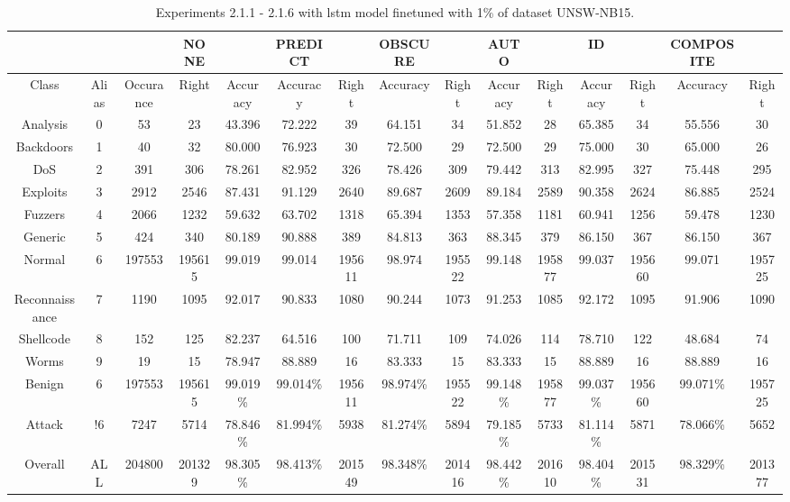 \begin{table}[htb]
    \centering
    \begin{tabular}{@{}ccccccccccccccc@{}}
        \toprule
         &  &  & NONE &  & PREDICT &  & OBSCURE &  & AUTO &  & ID &  & COMPOSITE &  \\
        \midrule
        Class &  Alias &  Occurance &  Right &  Accuracy &  Accuracy &  Right &  Accuracy &  Right &  Accuracy &  Right &  Accuracy &  Right &  Accuracy &  Right \\
        Analysis &  0 &  53 &  23 &  43.396 &  72.222 &  39 &  64.151 &  34 &  51.852 &  28 &  65.385 &  34 &  55.556 &  30 \\
        Backdoors &  1 &  40 &  32 &  80.000 &  76.923 &  30 &  72.500 &  29 &  72.500 &  29 &  75.000 &  30 &  65.000 &  26 \\
        DoS &  2 &  391 &  306 &  78.261 &  82.952 &  326 &  78.426 &  309 &  79.442 &  313 &  82.995 &  327 &  75.448 &  295 \\
        Exploits &  3 &  2912 &  2546 &  87.431 &  91.129 &  2640 &  89.687 &  2609 &  89.184 &  2589 &  90.358 &  2624 &  86.885 &  2524 \\
        Fuzzers &  4 &  2066 &  1232 &  59.632 &  63.702 &  1318 &  65.394 &  1353 &  57.358 &  1181 &  60.941 &  1256 &  59.478 &  1230 \\
        Generic &  5 &  424 &  340 &  80.189 &  90.888 &  389 &  84.813 &  363 &  88.345 &  379 &  86.150 &  367 &  86.150 &  367 \\
        Normal &  6 &  197553 &  195615 &  99.019 &  99.014 &  195611 &  98.974 &  195522 &  99.148 &  195877 &  99.037 &  195660 &  99.071 &  195725 \\
        Reconnaissance &  7 &  1190 &  1095 &  92.017 &  90.833 &  1080 &  90.244 &  1073 &  91.253 &  1085 &  92.172 &  1095 &  91.906 &  1090 \\
        Shellcode &  8 &  152 &  125 &  82.237 &  64.516 &  100 &  71.711 &  109 &  74.026 &  114 &  78.710 &  122 &  48.684 &  74 \\
        Worms &  9 &  19 &  15 &  78.947 &  88.889 &  16 &  83.333 &  15 &  83.333 &  15 &  88.889 &  16 &  88.889 &  16 \\
        Benign &  6 &  197553 &  195615 &  99.019\% &  99.014\% &  195611 &  98.974\% &  195522 &  99.148\% &  195877 &  99.037\% &  195660 &  99.071\% &  195725 \\
        Attack &  !6 &  7247 &  5714 &  78.846\% &  81.994\% &  5938 &  81.274\% &  5894 &  79.185\% &  5733 &  81.114\% &  5871 &  78.066\% &  5652 \\
        Overall &  ALL &  204800 &  201329 &  98.305\% &  98.413\% &  201549 &  98.348\% &  201416 &  98.442\% &  201610 &  98.404\% &  201531 &  98.329\% &  201377 \\
        \bottomrule
    \end{tabular}
    \caption{Experiments 2.1.1 - 2.1.6 with \gls{lstm} model finetuned with 1\% of dataset UNSW-NB15.}
    \label{table:results:lstm:flows15_10}
\end{table}